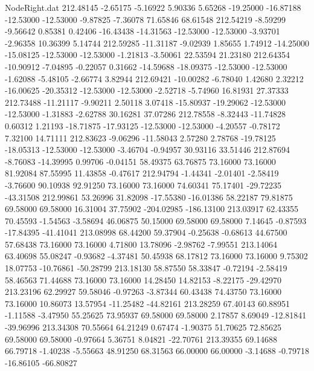 \begin{filecontents}{NodeRight.dat}
 212.48145   -2.65175   -5.16922     5.90336    5.65268  -19.25000  -16.87188  -12.53000  -12.53000   -9.87825   -7.36078   71.65846   68.61548
 212.54219   -8.59299   -9.56642     0.85381    0.42406  -16.43438  -14.31563  -12.53000  -12.53000   -3.93701   -2.96358   10.36399    5.14744
 212.59285  -11.31187   -9.02939     1.85655    1.74912  -14.25000  -15.08125  -12.53000  -12.53000   -1.21813   -3.50061   22.53594   21.23180
 212.64354  -10.90912   -7.04895    -0.22057    0.31662  -14.59688  -18.09375  -12.53000  -12.53000   -1.62088   -5.48105   -2.66774    3.82944
 212.69421  -10.00282   -6.78040     1.42680    2.32212  -16.00625  -20.35312  -12.53000  -12.53000   -2.52718   -5.74960   16.81931   27.37333
 212.73488  -11.21117   -9.90211     2.50118    3.07418  -15.80937  -19.29062  -12.53000  -12.53000   -1.31883   -2.62788   30.16281   37.07286
 212.78558   -8.32443  -11.74828     0.60312    1.21193  -18.71875  -17.93125  -12.53000  -12.53000   -4.20557   -0.78172    7.32100   14.71111
 212.83623   -9.06296  -11.58043     2.57280    2.78768  -19.78125  -18.05313  -12.53000  -12.53000   -3.46704   -0.94957   30.93116   33.51446
 212.87694   -8.76083  -14.39995     0.99706   -0.04151   58.49375   63.76875   73.16000   73.16000   81.92084   87.55995   11.43858   -0.47617
 212.94794   -1.44341   -2.01401    -2.58419   -3.76600   90.10938   92.91250   73.16000   73.16000   74.60341   75.17401  -29.72235  -43.31508
 212.99861   53.26996   31.82098   -17.55380  -16.01386   58.22187   79.81875   69.58000   69.58000   16.31004   37.75902 -204.02985 -186.13100
 213.03917   62.43355   70.45593    -1.54563   -3.58694   46.06875   50.15000   69.58000   69.58000    7.14645   -0.87593  -17.84395  -41.41041
 213.08998   68.44200   59.37904    -0.25638   -0.68613   44.67500   57.68438   73.16000   73.16000    4.71800   13.78096   -2.98762   -7.99551
 213.14064   63.40698   55.08247    -0.93682   -4.37481   50.45938   68.17812   73.16000   73.16000    9.75302   18.07753  -10.76861  -50.28799
 213.18130   58.87550   58.33847    -0.72194   -2.58419   58.46563   71.44688   73.16000   73.16000   14.28450   14.82153   -8.22175  -29.42970
 213.23196   62.29927   59.58046    -0.97263   -3.87344   60.43438   74.43750   73.16000   73.16000   10.86073   13.57954  -11.25482  -44.82161
 213.28259   67.40143   60.88951    -1.11588   -3.47950   55.25625   73.95937   69.58000   69.58000    2.17857    8.69049  -12.81841  -39.96996
 213.34308   70.55664   64.21249     0.67474   -1.90375   51.70625   72.85625   69.58000   69.58000   -0.97664    5.36751    8.04821  -22.70761
 213.39355   69.14688   66.79718    -1.40238   -5.55663   48.91250   68.31563   66.00000   66.00000   -3.14688   -0.79718  -16.86105  -66.80827

\end{filecontents}

